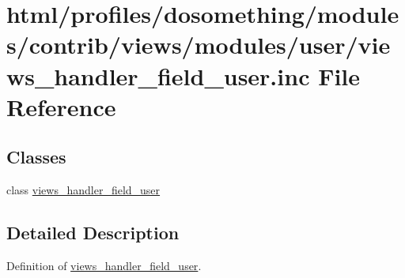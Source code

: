 \hypertarget{views__handler__field__user_8inc}{
\section{html/profiles/dosomething/modules/contrib/views/modules/user/views\_\-handler\_\-field\_\-user.inc File Reference}
\label{views__handler__field__user_8inc}
}
\subsection*{Classes}
\begin{DoxyCompactItemize}
\item 
class \hyperlink{classviews__handler__field__user}{views\_\-handler\_\-field\_\-user}
\end{DoxyCompactItemize}


\subsection{Detailed Description}
Definition of \hyperlink{classviews__handler__field__user}{views\_\-handler\_\-field\_\-user}. 